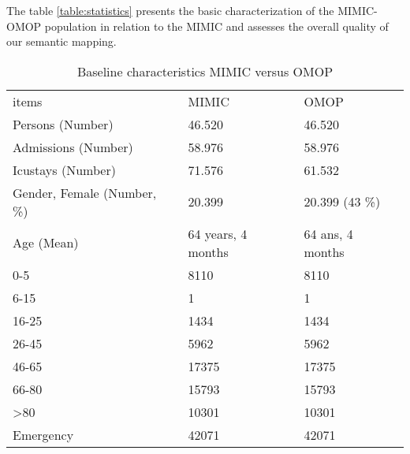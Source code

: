                                                                    
The table \ref{table:statistics} presents the basic characterization of the 
MIMIC-OMOP population in relation to the MIMIC and assesses the overall quality of 
our semantic mapping.

\begin{table*}[t]
\caption{Baseline characteristics MIMIC versus OMOP}
\begin{tabular}{@{}lll@{}}\toprule
items                                  & MIMIC                       & OMOP                               \\\colrule
Persons (Number)                       & 46.520                      & 46.520                             \\
Admissions (Number)                    & 58.976                      & 58.976                             \\
Icustays (Number)                      & 71.576                      & 61.532                             \\
Gender, Female (Number, \%)            & 20.399                      & 20.399 (43 \%)                     \\
Age (Mean)                             & 64 years, 4 months          & 64 ans, 4 months                   \\
0-5                                    & 8110                        & 8110                               \\
6-15                                   & 1                           & 1                                  \\
16-25                                  & 1434                        & 1434                               \\
26-45                                  & 5962                        & 5962                               \\
46-65                                  & 17375                       & 17375                              \\
66-80                                  & 15793                       & 15793                              \\
\textgreater{}80                       & 10301                       & 10301                              \\
Emergency                              & 42071                       & 42071                              \\

\end{tabular}
\end{table*}
